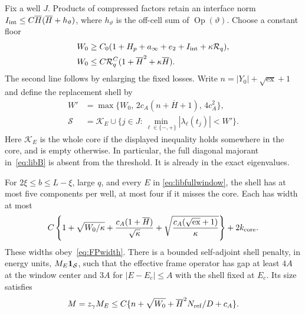 Fix a well $J$. Products of compressed factors retain an interface
norm $I_{\rm int}\le C\overline H(\overline H+h_\vartheta)$,
where $h_\vartheta$ is the off-cell sum of
$\operatorname{Op}(\vartheta)$. Choose a constant floor
\begin{equation}\label{eq:libWzero}
 \begin{split}
 W_0&\ge C_0(1+H_p+a_\infty+e_2+I_{\rm int}
                      +\kappa\mathcal R_q),\\
 W_0&\le C\mathcal R_q^C(1+\overline H^2+\kappa\overline H).
 \end{split}
\end{equation}
The second line follows by enlarging the fixed losses. Write
$n=|Y_0|+\sqrt{\mathrm{ex}}+1$ and define the replacement shell by
\begin{equation}\label{eq:libnewshell}
 \begin{split}
 W'&=\max\{W_0,\,2c_A(n+\overline H+1),\,4c_A^2\},\\
 \mathcal S&=\mathcal K_E\cup
 \{j\in J:\min_{\ell\in\{-,+\}}|\lambda_\ell(t_j)|<W'\}.
 \end{split}
\end{equation}
Here $\mathcal K_E$ is the whole core if the displayed inequality
holds somewhere in the core, and is empty otherwise.
In particular, the full diagonal majorant in~\eqref{eq:libB} is
absent from the threshold. It is already in the exact eigenvalues.

\begin{proposition}
\label{prop:libshell}
For $2\xi\le b\le L-\xi$, large $q$, and every $E$ in
\eqref{eq:libfullwindow}, the shell has at most five components per
well, at most four if it misses the core. Each has width at most
\begin{equation}\label{eq:libshellwidth}
 C\left\{1+\sqrt{W_0/\kappa}
 +\frac{c_A(1+\overline H)}{\sqrt\kappa}
 +\sqrt{\frac{c_A(\sqrt{\mathrm{ex}}+1)}\kappa}\right\}
       +2k_{\rm core}.
\end{equation}
These widths obey~\eqref{eq:FPwidth}.
There is a bounded self-adjoint shell penalty, in energy units,
$M_E\mathbf 1_{\mathcal S}$, such that the effective frame operator has
gap at least $4A$ at the window center and $3A$ for
$|E-E_c|\le A$ with the shell fixed at $E_c$. Its size satisfies
\begin{equation}\label{eq:libMbound}
 M=z_\gamma M_E\le C\{n+\sqrt{W_0}
                 +\overline H^2N_{\rm ref}/D+c_A\}.
\end{equation}
\end{proposition}

